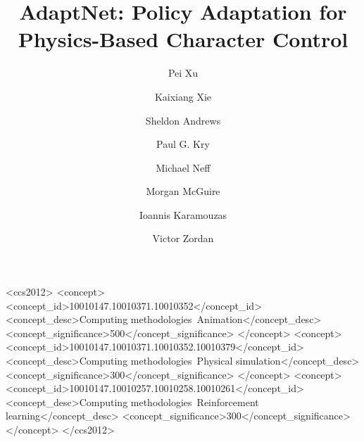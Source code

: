 \documentclass[acmtog]{acmart}
\begin{document}
\title{AdaptNet: Policy Adaptation for Physics-Based Character Control}

\author{Pei Xu}


\author{Kaixiang Xie}

\author{Sheldon Andrews}

\author{Paul G. Kry}

\author{Michael Neff}


\author{Morgan McGuire}


\author{Ioannis Karamouzas}

\author{Victor Zordan}



\begin{CCSXML}
<ccs2012>
   <concept>
       <concept_id>10010147.10010371.10010352</concept_id>
       <concept_desc>Computing methodologies~Animation</concept_desc>
       <concept_significance>500</concept_significance>
       </concept>
   <concept>
       <concept_id>10010147.10010371.10010352.10010379</concept_id>
       <concept_desc>Computing methodologies~Physical simulation</concept_desc>
       <concept_significance>300</concept_significance>
       </concept>
   <concept>
       <concept_id>10010147.10010257.10010258.10010261</concept_id>
       <concept_desc>Computing methodologies~Reinforcement learning</concept_desc>
       <concept_significance>300</concept_significance>
       </concept>
 </ccs2012>
\end{CCSXML}
\end{document}
